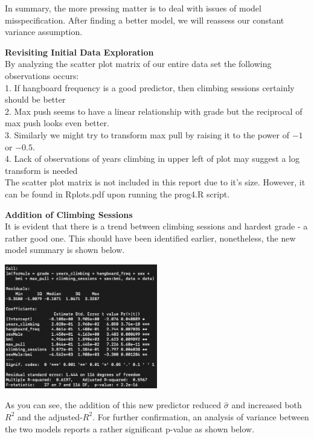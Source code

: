 \documentclass[11pt]{amsart}
\newcommand{\tab}{\hspace*{.75cm}}
\begin{document}
In summary, the more pressing matter is to deal with issues of model misspecification.
After finding a better model, we will reassess our constant variance assumption. 

\newpage
{\bf\large Revisiting Initial Data Exploration}\\
By analyzing the scatter plot matrix of our entire data set the following observations occurs:\\

\tab 1. If hangboard frequency is a good predictor, then climbing sessions certainly should be better\\
\tab 2. Max push seems to have a linear relationship with grade but the reciprocal of max push looks even better.\\
\tab 3. Similarly we might try to transform max pull by raising it to the power of $-1$ or $-0.5$. \\
\tab 4. Lack of observations of years climbing in upper left of plot may suggest a log transform is needed\\

The scatter plot matrix is not included in this report due to it's size. However, it can be found in Rplots.pdf upon running the prog4.R script.

\vspace{0.3in}
{\bf\large Addition of Climbing Sessions}\\
It is evident that there is a trend between climbing sessions and hardest grade - a rather good one.
This should have been identified earlier, nonetheless, the new model summary is shown below.\\
 
\begin{center}
\includegraphics[width=0.5\textwidth]{mod1}\\
\end{center}
 
As you can see, the addition of this new predictor reduced $\hat\sigma$ and increased both $R^2$ and the adjusted-$R^2$.
For further confirmation, an analysis of variance between the two models reports a rather significant p-value as shown below.
\end{document}
